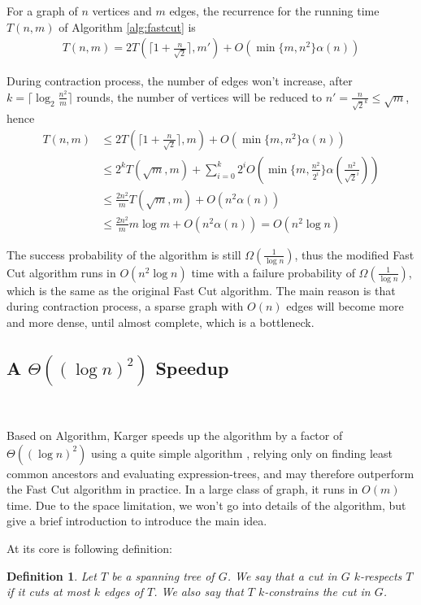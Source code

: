 \documentclass[11pt]{article}
\theoremstyle{plain}
\newtheorem{definition}{Definition}[section]
\begin{document}
For a graph of $n$ vertices and $m$ edges, the recurrence for the running time $T(n,m)$ of Algorithm \ref{alg:fastcut} is
\begin{align*}
    T(n,m)=2T\left(\lceil 1+\frac{n}{\sqrt{2}}\rceil,m'\right)+O(\min\{m,n^2\}\alpha(n))
\end{align*}

During contraction process, the number of edges won't increase, after $k=\lceil \log_2\frac{n^2}{m}\rceil$ rounds, the number of vertices will be reduced to $n'=\frac{n}{\sqrt{2}^k}\leq \sqrt{m}$, hence
\begin{align*}
    T(n,m)&\leq 2T\left(\lceil 1+\frac{n}{\sqrt{2}}\rceil,m\right)+O(\min\{m,n^2\}\alpha(n))\\
    &\leq 2^{k}T(\sqrt{m}, m)+\sum_{i=0}^{k} 2^{i}O(\min\{m,\frac{n^2}{2^i}\}\alpha(\frac{n^2}{\sqrt{2}^i}))\\
    &\leq\frac{2n^2}{m}T(\sqrt{m},m)+O(n^2\alpha(n))\\
    &\leq \frac{2n^2}{m}m\log m+O(n^2\alpha(n))=O(n^2\log n)
\end{align*}

The success probability of the algorithm is still $\Omega(\frac{1}{\log n})$, thus the modified Fast Cut algorithm runs in $O(n^2\log n)$ time with a failure probability of $\Omega(\frac{1}{\log n})$, which is the same as the original Fast Cut algorithm. The main reason is that during contraction process, a sparse graph with $O(n)$ edges will become more and more dense, until almost complete, which is a bottleneck.

\subsection{A \texorpdfstring{$\Theta((\log n)^2)$}{ } Speedup}\

Based on Algorithm, Karger speeds up the algorithm by a factor of $\Theta((\log n)^2)$ using a quite simple algorithm \cite{karger2000minimum}, relying only on finding least common ancestors and evaluating expression-trees, and may
therefore outperform the Fast Cut algorithm in practice. In a large class of graph, it runs in $O(m)$ time. Due to the space limitation, we won't go into details of the algorithm, but give a brief introduction to introduce the main idea.

At its core is following definition:

\begin{definition}
    Let $T$ be a spanning tree of $G$. We say that a cut in $G$ $k$-respects $T$ if it cuts at most $k$ edges of $T$. We also say that $T$ $k$-constrains the cut in $G$.
\end{definition}
\end{document}
